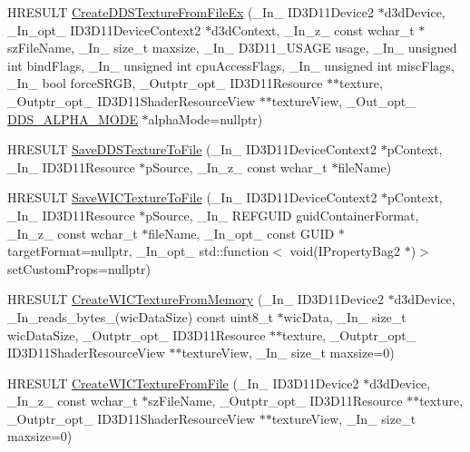 \begin{DoxyCompactItemize}
\item 
H\+R\+E\+S\+U\+LT \hyperlink{namespace_direct_x_aae6b0c666af42aa63eae2ae632a146a1}{Create\+D\+D\+S\+Texture\+From\+File\+Ex} (\+\_\+\+In\+\_\+ I\+D3\+D11\+Device2 $\ast$d3d\+Device, \+\_\+\+In\+\_\+opt\+\_\+ I\+D3\+D11\+Device\+Context2 $\ast$d3d\+Context, \+\_\+\+In\+\_\+z\+\_\+ const wchar\+\_\+t $\ast$sz\+File\+Name, \+\_\+\+In\+\_\+ size\+\_\+t maxsize, \+\_\+\+In\+\_\+ D3\+D11\+\_\+\+U\+S\+A\+GE usage, \+\_\+\+In\+\_\+ unsigned int bind\+Flags, \+\_\+\+In\+\_\+ unsigned int cpu\+Access\+Flags, \+\_\+\+In\+\_\+ unsigned int misc\+Flags, \+\_\+\+In\+\_\+ bool force\+S\+R\+GB, \+\_\+\+Outptr\+\_\+opt\+\_\+ I\+D3\+D11\+Resource $\ast$$\ast$texture, \+\_\+\+Outptr\+\_\+opt\+\_\+ I\+D3\+D11\+Shader\+Resource\+View $\ast$$\ast$texture\+View, \+\_\+\+Out\+\_\+opt\+\_\+ \hyperlink{namespace_direct_x_a7cb48689d75471680c0bf7f79caaaf1f}{D\+D\+S\+\_\+\+A\+L\+P\+H\+A\+\_\+\+M\+O\+DE} $\ast$alpha\+Mode=nullptr)
\item 
H\+R\+E\+S\+U\+LT \hyperlink{namespace_direct_x_a9970eb7f3d61d9fed1b4430c6b3ac2dd}{Save\+D\+D\+S\+Texture\+To\+File} (\+\_\+\+In\+\_\+ I\+D3\+D11\+Device\+Context2 $\ast$p\+Context, \+\_\+\+In\+\_\+ I\+D3\+D11\+Resource $\ast$p\+Source, \+\_\+\+In\+\_\+z\+\_\+ const wchar\+\_\+t $\ast$file\+Name)
\item 
H\+R\+E\+S\+U\+LT \hyperlink{namespace_direct_x_ac0db31dff824e4439e907487356c03a5}{Save\+W\+I\+C\+Texture\+To\+File} (\+\_\+\+In\+\_\+ I\+D3\+D11\+Device\+Context2 $\ast$p\+Context, \+\_\+\+In\+\_\+ I\+D3\+D11\+Resource $\ast$p\+Source, \+\_\+\+In\+\_\+ R\+E\+F\+G\+U\+ID guid\+Container\+Format, \+\_\+\+In\+\_\+z\+\_\+ const wchar\+\_\+t $\ast$file\+Name, \+\_\+\+In\+\_\+opt\+\_\+ const G\+U\+ID $\ast$target\+Format=nullptr, \+\_\+\+In\+\_\+opt\+\_\+ std\+::function$<$ void(I\+Property\+Bag2 $\ast$)$>$ set\+Custom\+Props=nullptr)
\item 
H\+R\+E\+S\+U\+LT \hyperlink{namespace_direct_x_a4817e3ce620512e0f81d1dbfe7460970}{Create\+W\+I\+C\+Texture\+From\+Memory} (\+\_\+\+In\+\_\+ I\+D3\+D11\+Device2 $\ast$d3d\+Device, \+\_\+\+In\+\_\+reads\+\_\+bytes\+\_\+(wic\+Data\+Size) const uint8\+\_\+t $\ast$wic\+Data, \+\_\+\+In\+\_\+ size\+\_\+t wic\+Data\+Size, \+\_\+\+Outptr\+\_\+opt\+\_\+ I\+D3\+D11\+Resource $\ast$$\ast$texture, \+\_\+\+Outptr\+\_\+opt\+\_\+ I\+D3\+D11\+Shader\+Resource\+View $\ast$$\ast$texture\+View, \+\_\+\+In\+\_\+ size\+\_\+t maxsize=0)
\item 
H\+R\+E\+S\+U\+LT \hyperlink{namespace_direct_x_a3544b37e0b09ce147800bb6b14b1bc9b}{Create\+W\+I\+C\+Texture\+From\+File} (\+\_\+\+In\+\_\+ I\+D3\+D11\+Device2 $\ast$d3d\+Device, \+\_\+\+In\+\_\+z\+\_\+ const wchar\+\_\+t $\ast$sz\+File\+Name, \+\_\+\+Outptr\+\_\+opt\+\_\+ I\+D3\+D11\+Resource $\ast$$\ast$texture, \+\_\+\+Outptr\+\_\+opt\+\_\+ I\+D3\+D11\+Shader\+Resource\+View $\ast$$\ast$texture\+View, \+\_\+\+In\+\_\+ size\+\_\+t maxsize=0)

\end{DoxyCompactItemize}
